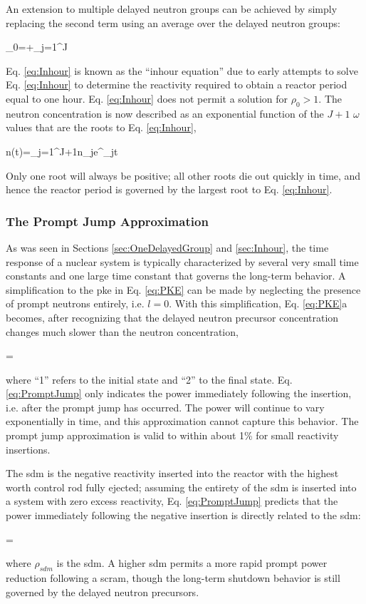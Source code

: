 An extension to multiple delayed neutron groups can be achieved by simply replacing the second term using an average over the delayed neutron groups:

\beq
\label{eq:Inhour}
\rho_0=+\sum_{j=1}^J
\eeq

Eq. \eqref{eq:Inhour} is known as the ``inhour equation'' due to early attempts to solve Eq. \eqref{eq:Inhour} to determine the reactivity required to obtain a reactor period equal to one hour. Eq. \eqref{eq:Inhour} does not permit a solution for \(\rho_0>1\). The neutron concentration is now described as an exponential function of the \(J+1\) \(\omega\) values that are the roots to Eq. \eqref{eq:Inhour},

\beq
n(t)=\sum_{j=1}^{J+1}n_je^{\omega_jt}
\eeq

Only one root will always be positive; all other roots die out quickly in time, and hence the reactor period is governed by the largest root to Eq. \eqref{eq:Inhour}.

\subsubsection{The Prompt Jump Approximation}

As was seen in Sections \ref{sec:OneDelayedGroup} and \ref{sec:Inhour}, the time response of a nuclear system is typically characterized by several very small time constants and one large time constant that governs the long-term behavior. A simplification to the \gls{pke} in Eq. \eqref{eq:PKE} can be made by neglecting the presence of prompt neutrons entirely, i.e. \(l=0\). With this simplification, Eq. \eqref{eq:PKE}a becomes, after recognizing that the delayed neutron precursor concentration changes much slower than the neutron concentration,

\beq
\label{eq:PromptJump}
=
\eeq

where ``1'' refers to the initial state and ``2'' to the final state. Eq. \eqref{eq:PromptJump} only indicates the power immediately following the insertion, i.e. after the prompt jump has occurred. The power will continue to vary exponentially in time, and this approximation cannot capture this behavior. The prompt jump approximation is valid to within about 1\% for small reactivity insertions.

The \gls{sdm} is the negative reactivity inserted into the reactor with the highest worth control rod fully ejected; assuming the entirety of the \gls{sdm} is inserted into a system with zero excess reactivity, Eq. \eqref{eq:PromptJump} predicts that the power immediately following the negative insertion is directly related to the \gls{sdm}:

\beq
{}=
\eeq

where \(\rho_{sdm}\) is the \gls{sdm}. A higher \gls{sdm} permits a more rapid prompt power reduction following a scram, though the long-term shutdown behavior is still governed by the delayed neutron precursors.

